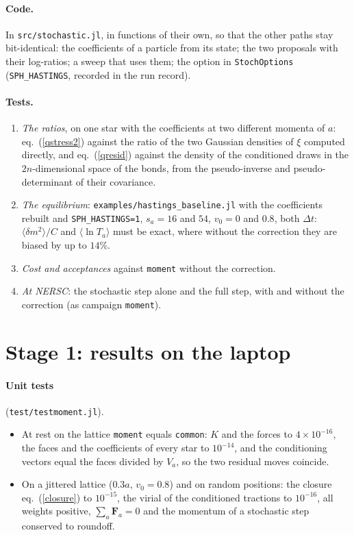 \documentclass[11pt,aps,preprint,nofootinbib,superscriptaddress,tightenlines]{revtex4-2}
\def\Eq#1{eq.~(\ref{#1})}
\let\oldparagraph\paragraph
\renewcommand{\paragraph}{\par\bigskip\oldparagraph}
\begin{document}
\paragraph{Code.}  In \texttt{src/stochastic.jl}, in functions of their own, so that the other paths stay bit-identical: the coefficients of
a particle from its state; the two proposals with their log-ratios; a sweep that uses them; the option in \texttt{StochOptions}
(\texttt{SPH\_HASTINGS}, recorded in the run record).

\paragraph{Tests.}
\begin{enumerate}
\item \emph{The ratios}, on one star with the coefficients at two different momenta of $a$: \Eq{qstress2} against the ratio of the two
  Gaussian densities of $\xi$ computed directly, and \Eq{qresid} against the density of the conditioned draws in the $2n$-dimensional
  space of the bonds, from the pseudo-inverse and pseudo-determinant of their covariance.
\item \emph{The equilibrium}: \texttt{examples/hastings\_baseline.jl} with the coefficients rebuilt and \texttt{SPH\_HASTINGS=1}, $s_a=16$ and $54$, $v_0=0$
  and $0.8$, both $\Delta t$: $\langle\delta m^2\rangle/C$ and $\langle\ln T_a\rangle$ must be exact, where without the correction they are biased by up to $14\%$.
\item \emph{Cost and acceptances} against \texttt{moment} without the correction.
\item \emph{At NERSC}: the stochastic step alone and the full step, with and without the correction (as campaign \texttt{moment}).
\end{enumerate}

\section{Stage 1: results on the laptop}
\label{sec:laptop}

\paragraph{Unit tests} (\texttt{test/testmoment.jl}).
\begin{itemize}
\item At rest on the lattice \texttt{moment} equals \texttt{common}: $K$ and the forces to $4\times10^{-16}$, the faces and the coefficients of every star to
  $10^{-14}$, and the conditioning vectors equal the faces divided by $V_a$, so the two residual moves coincide.
\item On a jittered lattice ($0.3a$, $v_0=0.8$) and on random positions: the closure \Eq{closure} to $10^{-15}$, the virial of the conditioned
  tractions to $10^{-16}$, all weights positive, $\sum_a\bm F_a=0$ and the momentum of a stochastic step conserved to roundoff.
\end{itemize}
\end{document}
